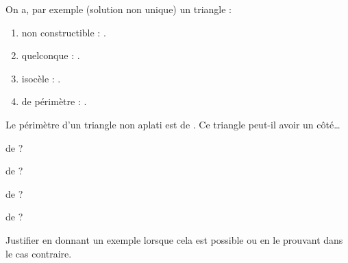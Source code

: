 \begin{Maquette}[Fiche,CorrigeFin,Colonnes=2]{}
\begin{multicols}{2}
      \begin{Solution}
         On a, par exemple (solution non unique) un triangle :
         \begin{enumerate}
            \item non constructible : .
            \item quelconque : .
            \item isocèle : .
            \item de périmètre  : .
         \end{enumerate}
      \end{Solution}
      
      
      \begin{exercice}[Dur] %
         Le périmètre d'un triangle non aplati est de . Ce triangle peut-il avoir un côté\dots
         \begin{colenumerate}
            \item de  ?
            \item de  ?
            \item de  ?
            \item de  ?
         \end{colenumerate}
         Justifier en donnant un exemple lorsque cela est possible ou en le prouvant dans le cas contraire.
      \end{exercice}
      

\end{multicols}
\end{Maquette}
